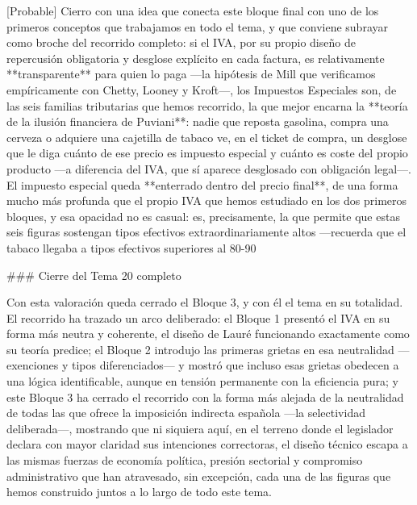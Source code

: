 \documentclass[10pt,a4paper]{article}
\begin{document}
[Probable] Cierro con una idea que conecta este bloque final con uno de los primeros conceptos que trabajamos en todo el tema, y que conviene subrayar como broche del recorrido completo: si el IVA, por su propio diseño de repercusión obligatoria y desglose explícito en cada factura, es relativamente **transparente** para quien lo paga —la hipótesis de Mill que verificamos empíricamente con Chetty, Looney y Kroft—, los Impuestos Especiales son, de las seis familias tributarias que hemos recorrido, la que mejor encarna la **teoría de la ilusión financiera de Puviani**: nadie que reposta gasolina, compra una cerveza o adquiere una cajetilla de tabaco ve, en el ticket de compra, un desglose que le diga cuánto de ese precio es impuesto especial y cuánto es coste del propio producto —a diferencia del IVA, que sí aparece desglosado con obligación legal—. El impuesto especial queda **enterrado dentro del precio final**, de una forma mucho más profunda que el propio IVA que hemos estudiado en los dos primeros bloques, y esa opacidad no es casual: es, precisamente, la que permite que estas seis figuras sostengan tipos efectivos extraordinariamente altos —recuerda que el tabaco llegaba a tipos efectivos superiores al 80-90%

### Cierre del Tema 20 completo

Con esta valoración queda cerrado el Bloque 3, y con él el tema en su totalidad. El recorrido ha trazado un arco deliberado: el Bloque 1 presentó el IVA en su forma más neutra y coherente, el diseño de Lauré funcionando exactamente como su teoría predice; el Bloque 2 introdujo las primeras grietas en esa neutralidad —exenciones y tipos diferenciados— y mostró que incluso esas grietas obedecen a una lógica identificable, aunque en tensión permanente con la eficiencia pura; y este Bloque 3 ha cerrado el recorrido con la forma más alejada de la neutralidad de todas las que ofrece la imposición indirecta española —la selectividad deliberada—, mostrando que ni siquiera aquí, en el terreno donde el legislador declara con mayor claridad sus intenciones correctoras, el diseño técnico escapa a las mismas fuerzas de economía política, presión sectorial y compromiso administrativo que han atravesado, sin excepción, cada una de las figuras que hemos construido juntos a lo largo de todo este tema.
\end{document}
